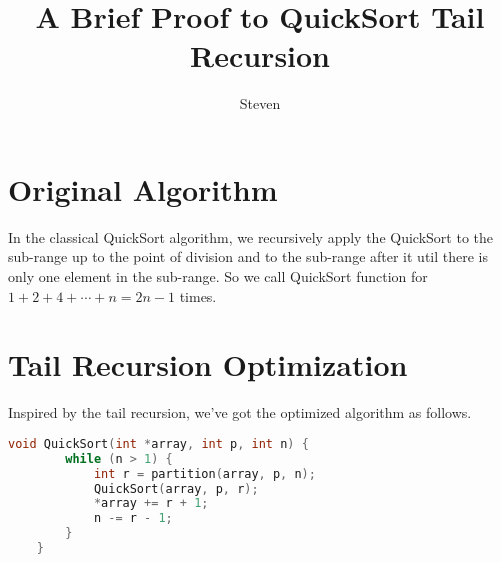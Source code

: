 \documentclass[10pt]{article}
\begin{document}
\title{\bf A Brief Proof to QuickSort Tail Recursion}

\author{Steven}
\date{}
\maketitle


\section{Original Algorithm}

In the classical QuickSort algorithm, we recursively apply the QuickSort to the sub-range
up to the point of division and to the sub-range after it util there is only one element
in the sub-range. So we call QuickSort function for $ 1+2+4+\cdots+n=2n-1 $ times.


\section{Tail Recursion Optimization}

Inspired by the tail recursion, we've got the optimized algorithm as follows.

\begin{lstlisting}[language=C++]
	void QuickSort(int *array, int p, int n) {
		while (n > 1) {
			int r = partition(array, p, n);
			QuickSort(array, p, r);
			*array += r + 1;
			n -= r - 1;
		}
	}
\end{lstlisting}
\end{document}
